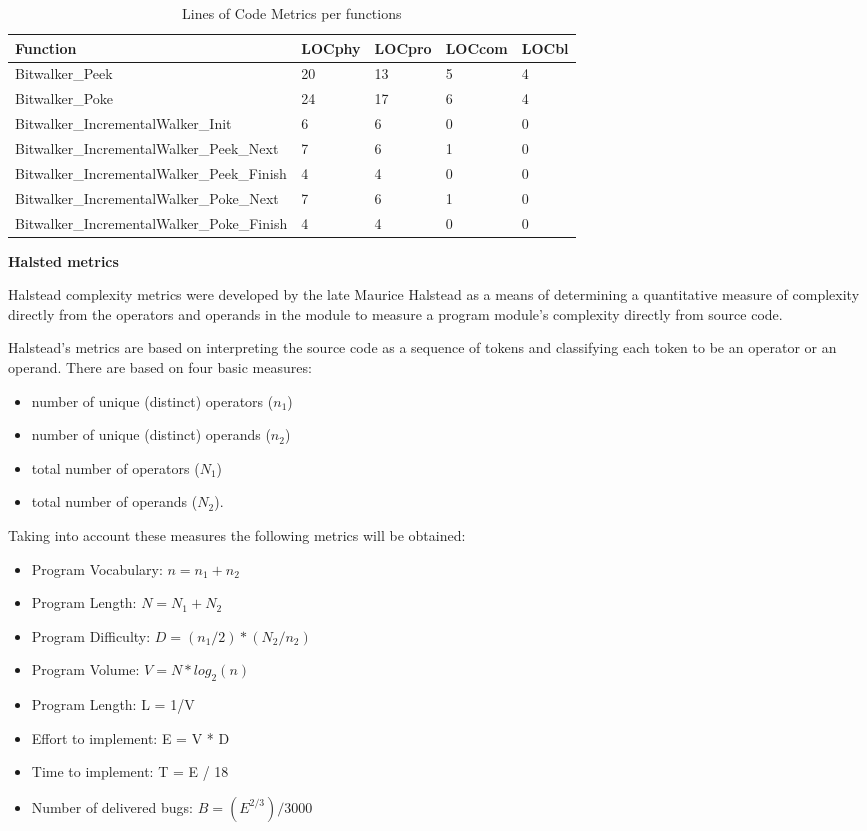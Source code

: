 \begin{description}
\begin{longtable}{||p{}|p{}|p{}|p{}|p{}||}
  \caption{Lines of Code Metrics per functions}\\
    \hline\hline
    \textbf{Function} &\textbf{LOCphy} & \textbf{LOCpro} & \textbf{LOCcom} & \textbf{LOCbl}\\
    \hline\hline
    \endhead
    \hline\hline
    \endfoot
    Bitwalker\_Peek & 20 & 13 & 5 & 4
    \\
    \hline
    Bitwalker\_Poke & 24 & 17 & 6 & 4
    \\
    \hline
    Bitwalker\_IncrementalWalker\_Init & 6 & 6 & 0 & 0
    \\
    \hline
    Bitwalker\_IncrementalWalker\_Peek\_Next & 7 & 6 & 1 & 0
    \\
    \hline
    Bitwalker\_IncrementalWalker\_Peek\_Finish & 4 & 4 & 0 & 0
    \\
    \hline
    Bitwalker\_IncrementalWalker\_Poke\_Next & 7 & 6 & 1 & 0
    \\
    \hline
    Bitwalker\_IncrementalWalker\_Poke\_Finish & 4 & 4 & 0 & 0
    \\
    \hline
   \end{longtable}

\item \textbf{Halsted metrics}

Halstead complexity metrics were developed by the late Maurice Halstead as a means of determining a quantitative measure of complexity directly from the operators and operands in the module to measure a program module's complexity directly from source code.

Halstead's metrics are based on interpreting the source code as a sequence of tokens and classifying each token to be an operator or an operand. There are based on four basic measures:
\begin{itemize}
\item number of unique (distinct) operators ($n_1$)
\item number of unique (distinct) operands ($n_2$)
\item total number of operators ($N_1$)
\item total number of operands ($N_2$).
\end{itemize}

Taking into account these measures the following metrics will be obtained:
\begin{itemize}
\item Program Vocabulary: $n = n_1 + n_2$
\item Program Length: $N = N_1 + N_2$
\item Program Difficulty: $D = ( n_1 / 2 ) * ( N_2 / n_2 )$
\item Program Volume: $V = N * log_2 (n)$
\item Program Length: L = 1/V
\item Effort to implement: E = V * D
\item Time to implement: T = E / 18
\item Number of delivered bugs: $B = (E^{2/3}) / 3000$
\end{itemize}


\end{description}
